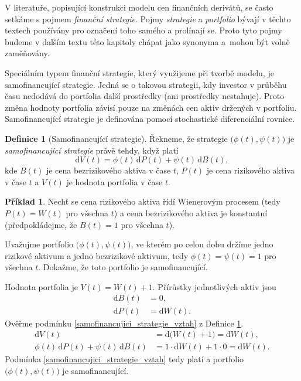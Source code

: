 \documentclass[a4paper,12pt]{report}
\theoremstyle{definition} \newtheorem{definice}[veta]{Definice}
\newtheorem{priklad}{Příklad}
\theoremstyle{remark}
\begin{document}
V literatuře, popisující konstrukci modelu cen finančních derivátů, se často setkáme s pojmem \textit{finanční strategie}.
Pojmy \textit{strategie} a \textit{portfolio} bývají v těchto textech používány pro označení toho samého a prolínají se.
Proto tyto pojmy budeme v dalším textu této kapitoly chápat jako synonyma a~mohou být volně zaměňovány.

Speciálním typem finanční strategie, který využijeme při tvorbě modelu, je samofinancující strategie.
Jedná se o takovou strategii, kdy investor v průběhu času nedodává do portfolia další prostředky (ani prostředky nestahuje).
Proto změna hodnoty portfolia závisí pouze na změnách cen aktiv držených v portfoliu. 
Samofinancující strategie je definována pomocí stochastické diferenciální rovnice.
\begin{definice}[Samofinancující strategie]\label{samofinancujici_strategie}
Řekneme, že strategie $\big(\phi(t),\psi(t)\big)$ je \textit{samofinancující strategie} právě tehdy, když platí
\begin{equation}\label{samofinancujici_strategie_vztah}
\mathrm{d}V(t)=\phi(t)\,\mathrm{d}P(t)+\psi(t)\,\mathrm{d}B(t),
\end{equation}
kde $B(t)$ je cena bezrizikového aktiva v čase $t$, $P(t)$ je cena rizikového aktiva v čase $t$ a $V(t)$ je hodnota portfolia v čase $t$.
\end{definice}

\begin{priklad}\label{samofinancujici_portfolio_priklad}
Nechť se cena rizikového aktiva řídí Wienerovým procesem (tedy $P(t)=W(t)$ pro všechna $t$) a cena bezrizikového aktiva je konstantní (předpokládejme, že $B(t)=1$ pro všechna $t$).

Uvažujme portfolio $\big(\phi(t),\psi(t)\big)$, ve kterém po celou dobu držíme jedno rizikové aktivum a jedno bezrizikové aktivum, tedy $\phi(t)=\psi(t)=1$ pro všechna $t$. 
Dokažme, že toto portfolio je samofinancující.

Hodnota portfolia je $V(t)=W(t)+1$.
Přírůstky jednotlivých aktiv jsou
\begin{align*}
\mathrm{d}B(t)&= 0, \\
\mathrm{d}P(t)&=\mathrm{d}W(t). 
\end{align*}
Ověřme podmínku \eqref{samofinancujici_strategie_vztah} z Definice \ref{samofinancujici_strategie}.
\begin{align*}
\mathrm{d}V(t)&=\mathrm{d}\big(W(t)+1\big)=\mathrm{d}W(t),\\
\phi(t)\,\mathrm{d}P(t)+\psi(t)\,\mathrm{d}B(t)&=1\cdot\mathrm{d}W(t)+1\cdot0=\mathrm{d}W(t).
\end{align*}
Podmínka \eqref{samofinancujici_strategie_vztah} tedy platí a portfolio $\big(\phi(t),\psi(t)\big)$ je samofinancující.
\end{priklad}
\end{document}
